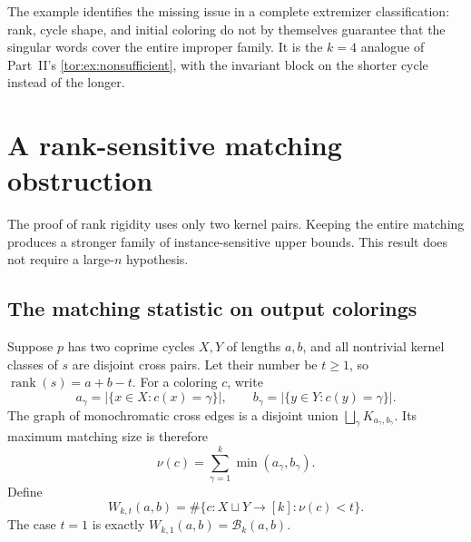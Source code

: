 \documentclass[11pt,a4paper]{article}
\numberwithin{equation}{section}
\theoremstyle{definition}
\theoremstyle{remark}
\newcommand{\rk}{\operatorname{rank}}
\newcommand{\Bip}{\mathcal B}
\begin{document}
The example identifies the missing issue in a complete extremizer
classification: rank, cycle shape, and initial coloring do not by themselves
guarantee that the singular words cover the entire improper family. It is the
$k=4$ analogue of Part~II's \cref{tor:ex:nonsufficient}, with the invariant
block on the shorter cycle instead of the longer.

\section{A rank-sensitive matching obstruction}\label{evo:sec:rank}

The proof of rank rigidity uses only two kernel pairs. Keeping the entire
matching produces a stronger family of instance-sensitive upper bounds. This
result does not require a large-$n$ hypothesis.

\subsection{The matching statistic on output colorings}

Suppose $p$ has two coprime cycles $X,Y$ of lengths $a,b$, and all nontrivial
kernel classes of $s$ are disjoint cross pairs. Let their number be $t\ge1$,
so $\rk(s)=a+b-t$. For a coloring $c$, write
\[
 a_\gamma=|\{x\in X:c(x)=\gamma\}|,\qquad
 b_\gamma=|\{y\in Y:c(y)=\gamma\}|.
\]
The graph of monochromatic cross edges is a disjoint union
$\bigsqcup_\gamma K_{a_\gamma,b_\gamma}$. Its maximum matching size is
therefore
\begin{equation}\label{evo:eq:nustatistic}
 \nu(c)=\sum_{\gamma=1}^k\min(a_\gamma,b_\gamma).
\end{equation}
Define
\begin{equation}\label{evo:eq:Wdefinition}
 W_{k,t}(a,b)=\#\{c:X\sqcup Y\to[k]:\nu(c)<t\}.
\end{equation}
The case $t=1$ is exactly $W_{k,1}(a,b)=\Bip_k(a,b)$.
\end{document}
